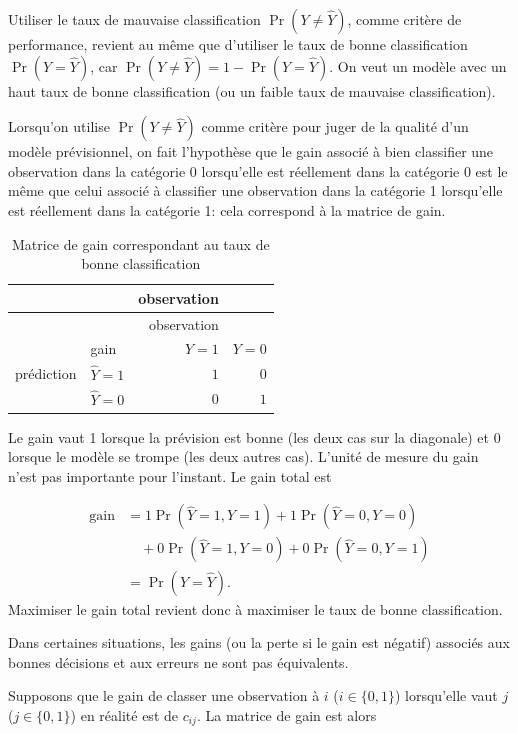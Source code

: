 \documentclass[
  11pt,
  letterpaper,
]{scrbook}
\theoremstyle{definition}
\theoremstyle{remark}
\begin{document}
Utiliser le taux de mauvaise classification \(\Pr(Y \neq \widehat{Y})\),
comme critère de performance, revient au même que d'utiliser le taux de
bonne classification \(\Pr(Y=\widehat{Y})\), car
\(\Pr(Y \neq \widehat{Y}) = 1-\Pr(Y=\widehat{Y})\). On veut un modèle
avec un haut taux de bonne classification (ou un faible taux de mauvaise
classification).

Lorsqu'on utilise \(\Pr(Y \neq \widehat{Y})\) comme critère pour juger
de la qualité d'un modèle prévisionnel, on fait l'hypothèse que le gain
associé à bien classifier une observation dans la catégorie 0
lorsqu'elle est réellement dans la catégorie 0 est le même que celui
associé à classifier une observation dans la catégorie 1 lorsqu'elle est
réellement dans la catégorie 1: cela correspond à la matrice de gain.

\hypertarget{tbl-03-gain1}{}
\begin{longtable}[]{@{}llrr@{}}
\caption{\label{tbl-03-gain1}Matrice de gain correspondant au taux de
bonne classification}\tabularnewline
\toprule\noalign{}
& & observation & \\
\midrule\noalign{}
\endfirsthead
\toprule\noalign{}
& & observation & \\
\midrule\noalign{}
\endhead
\bottomrule\noalign{}
\endlastfoot
& gain & \(Y=1\) & \(Y=0\) \\
prédiction & \(\widehat{Y}=1\) & \(1\) & \(0\) \\
& \(\widehat{Y}=0\) & \(0\) & \(1\) \\
\end{longtable}

Le gain vaut 1 lorsque la prévision est bonne (les deux cas sur la
diagonale) et 0 lorsque le modèle se trompe (les deux autres cas).
L'unité de mesure du gain n'est pas importante pour l'instant. Le gain
total est

\begin{align*}
\text{gain} &= 1 \Pr(\widehat{Y}=1, Y=1) + 1 \Pr(\widehat{Y}=0, Y=0)
\\ &\quad + 0 \Pr(\widehat{Y}=1, Y=0)  + 0 \Pr(\widehat{Y}=0, Y=1)
\\& = \Pr(Y = \widehat{Y}).
\end{align*} Maximiser le gain total revient donc à maximiser le taux de
bonne classification.

Dans certaines situations, les gains (ou la perte si le gain est
négatif) associés aux bonnes décisions et aux erreurs ne sont pas
équivalents.

Supposons que le gain de classer une observation à \(i\)
(\(i \in \{0,1\}\)) lorsqu'elle vaut \(j\) (\(j \in \{0,1\}\)) en
réalité est de \(c_{ij}\). La matrice de gain est alors
\end{document}

